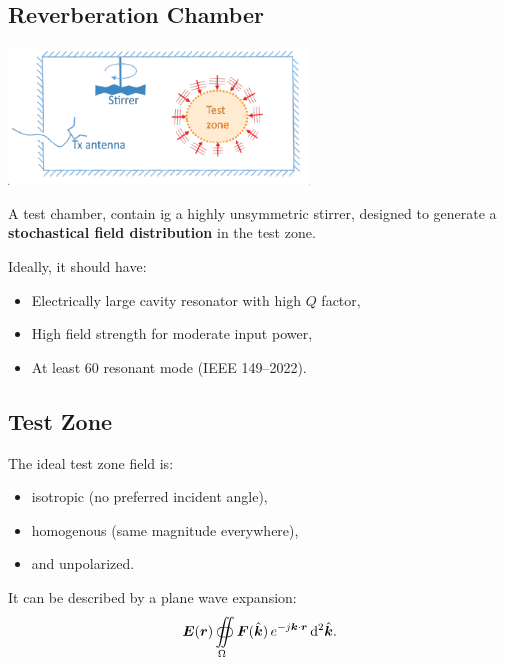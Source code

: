 \subsection{Reverberation Chamber}
\includegraphics[width=8cm]{content/at_meas/pictures/reverberation_chamber}

A test chamber, contain ig a highly unsymmetric stirrer, designed to generate a \textbf{stochastical field distribution} in the test zone.

Ideally, it should have:
\begin{itemize}
  \item Electrically large cavity resonator with high $Q$ factor,
  \item High field strength for moderate input power,
  \item At least 60 resonant mode (IEEE 149--2022).
\end{itemize}

\subsection{Test Zone}
The ideal test zone field is:
\begin{itemize}
  \item isotropic (no preferred incident angle),
  \item homogenous (same magnitude everywhere),
  \item and unpolarized.
\end{itemize}

It can be described by a plane wave expansion:
\begin{equation}
  \boldsymbol{E}(\boldsymbol{r}) \oiint\limits_{\Omega} \boldsymbol{F}(\hat{\boldsymbol{k}}) \, e^{-j\boldsymbol{k}\cdot\boldsymbol{r}}\, \mathrm{d}^{2}\hat{\boldsymbol{k}}.
\end{equation}
